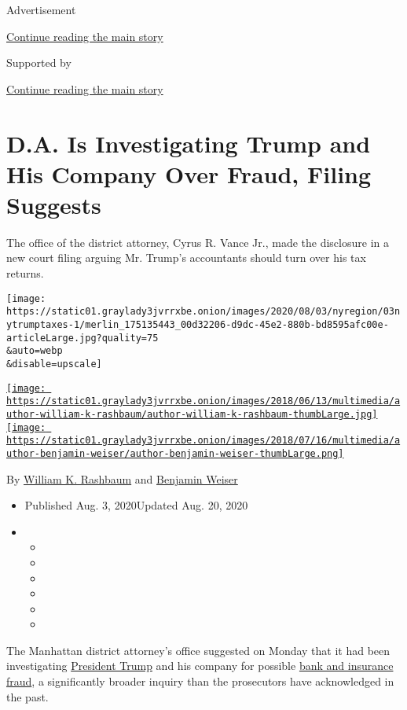 Advertisement

\protect\hyperlink{after-top}{Continue reading the main story}

Supported by

\protect\hyperlink{after-sponsor}{Continue reading the main story}

\hypertarget{da-is-investigating-trump-and-his-company-over-fraud-filing-suggests}{%
\section{D.A. Is Investigating Trump and His Company Over Fraud, Filing
Suggests}\label{da-is-investigating-trump-and-his-company-over-fraud-filing-suggests}}

The office of the district attorney, Cyrus R. Vance Jr., made the
disclosure in a new court filing arguing Mr. Trump's accountants should
turn over his tax returns.

\texttt{[image: https://static01.graylady3jvrrxbe.onion/images/2020/08/03/nyregion/03nytrumptaxes-1/merlin\_175135443\_00d32206-d9dc-45e2-880b-bd8595afc00e-articleLarge.jpg?quality=75\\\&auto=webp\\\&disable=upscale]}

\href{https://www.nytimes3xbfgragh.onion/by/william-k-rashbaum}{\texttt{[image: https://static01.graylady3jvrrxbe.onion/images/2018/06/13/multimedia/author-william-k-rashbaum/author-william-k-rashbaum-thumbLarge.jpg]}}\href{https://www.nytimes3xbfgragh.onion/by/benjamin-weiser}{\texttt{[image: https://static01.graylady3jvrrxbe.onion/images/2018/07/16/multimedia/author-benjamin-weiser/author-benjamin-weiser-thumbLarge.png]}}

By
\href{https://www.nytimes3xbfgragh.onion/by/william-k-rashbaum}{William
K. Rashbaum} and
\href{https://www.nytimes3xbfgragh.onion/by/benjamin-weiser}{Benjamin
Weiser}

\begin{itemize}
\item
  Published Aug. 3, 2020Updated Aug. 20, 2020
\item
  \begin{itemize}
  \item
  \item
  \item
  \item
  \item
  \item
  \end{itemize}
\end{itemize}

The Manhattan district attorney's office suggested on Monday that it had
been investigating
\href{https://www.nytimes3xbfgragh.onion/2020/08/05/nyregion/trump-taxes-vance-deutsche-bank.html}{President
Trump} and his company for possible
\href{https://www.nytimes3xbfgragh.onion/2020/08/20/nyregion/donald-trump-taxes-cyrus-vance.html}{bank
and insurance fraud}, a significantly broader inquiry than the
prosecutors have acknowledged in the past.

